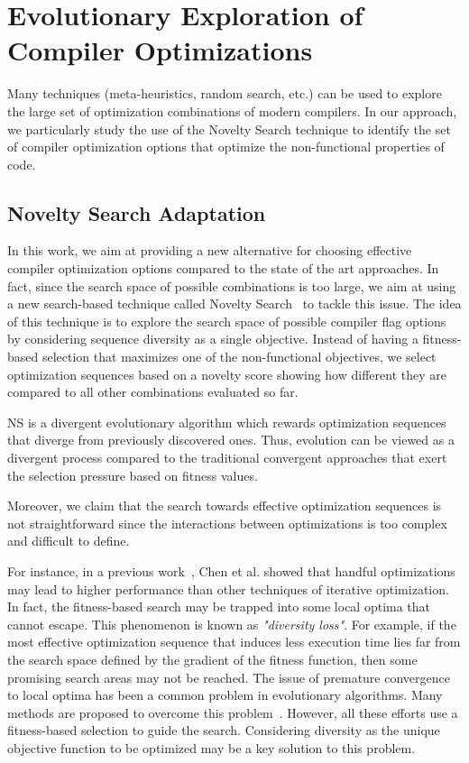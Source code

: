 \section{Evolutionary Exploration of Compiler Optimizations }
Many techniques (meta-heuristics, random search, etc.) can be used to explore the large set of optimization combinations of modern compilers. 
In our approach, we particularly study the use of the Novelty Search technique to identify the set of compiler optimization options that optimize the non-functional properties of code.

\subsection{Novelty Search Adaptation}

In this work, we aim at providing a new alternative for choosing effective compiler optimization options compared to the state of the art approaches. 
In fact, since the search space of possible combinations is too large, we aim at using a new search-based technique called Novelty Search~\cite{lehman2008exploiting} to tackle this issue. 
The idea of this technique is to explore the search space of possible compiler flag options by considering sequence diversity as a single objective. 
Instead of having a fitness-based selection that maximizes one of the non-functional objectives, we select optimization sequences based on a novelty score showing how different they are compared to all other combinations evaluated so far. 

NS is a divergent evolutionary algorithm which rewards optimization sequences that diverge from previously discovered ones. Thus, evolution can be viewed as a divergent process compared to the traditional convergent approaches that exert the selection pressure based on fitness values.

Moreover, we claim that the search towards effective optimization sequences is not straightforward since the interactions between optimizations is too complex and difficult to define. 

For instance, in a previous work~\cite{chen2012deconstructing}, Chen et al. showed that handful optimizations may lead to higher performance than other techniques of iterative optimization. 
In fact, the fitness-based search may be trapped into some local optima that cannot escape\cite{bodin1998iterative}. 
This phenomenon is known as \textit{"diversity loss"}. For example, if the most effective optimization sequence that induces less execution time lies far from the search space defined by the gradient of the fitness function, then some promising search areas may not be reached. 
The issue of premature convergence to local optima has been a common problem in evolutionary algorithms. 
Many methods are proposed to overcome this problem~\cite{banzhaf1996effect}. 
However, all these efforts use a fitness-based selection to guide the search. Considering diversity as the unique objective function to be optimized may be a key solution to this problem.

